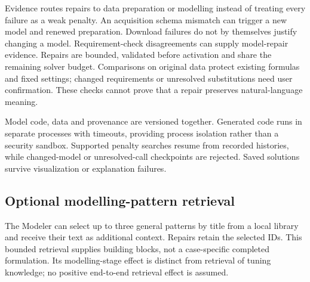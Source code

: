 Evidence routes repairs to data preparation or modelling instead of treating every failure as a weak penalty.
An acquisition schema mismatch can trigger a new model and renewed preparation. Download failures do not
by themselves justify changing a model. Requirement-check disagreements can supply model-repair evidence.
Repairs are bounded, validated before activation and share the remaining solver budget. Comparisons on original
data protect existing formulas and fixed settings; changed requirements or unresolved substitutions need user
confirmation. These checks cannot prove that a repair preserves natural-language meaning.

Model code, data and provenance are versioned together. Generated code runs in separate processes with
timeouts, providing process isolation rather than a security sandbox. Supported penalty searches resume from
recorded histories, while changed-model or unresolved-call checkpoints are rejected. Saved solutions survive
visualization or explanation failures.

\subsection{Optional modelling-pattern retrieval}
The Modeler can select up to three general patterns by title from a local library and receive their text as
additional context. Repairs retain the selected IDs. This bounded retrieval supplies building blocks, not a
case-specific completed formulation. Its modelling-stage effect is distinct from retrieval of tuning knowledge;
no positive end-to-end retrieval effect is assumed.

